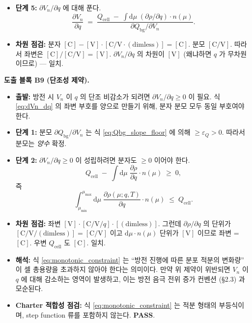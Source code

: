 \documentclass[11pt,a4paper]{article}
\newcommand{\dd}{\mathrm{d}}
\newcommand{\bg}{\mathrm{bg}}
\newcommand{\cell}{\mathrm{cell}}
\newcommand{\Cunit}{\mathrm{C}}
\newcommand{\mucont}{\mu}
\newcommand{\nmu}{n(\mucont)}
\begin{document}
\begin{itemize}
\begin{equation}
      \label{eq:cb_dq_combined}
      \end{equation}
\item \textbf{단계 5:} $\partial V_n/\partial q$ 에 대해 푼다.
      \begin{equation}
      \boxed{
      \frac{\partial V_n}{\partial q}
      \;=\;
      \frac{
      Q_{\cell}
      \;-\;
      \int \dd\mucont\;(\partial \rho/\partial q) \cdot \nmu
      }
      {\partial Q_{\bg}/\partial V_n}.
      }
      \label{eq:dVn_dq}
      \end{equation}
\item \textbf{차원 점검:} 분자 $[\Cunit] - [\mathrm{V}]\cdot[\Cunit/\mathrm{V}\cdot
      \mathrm{(dimless)}] = [\Cunit]$. 분모 $[\Cunit/\mathrm{V}]$. 따라서 좌변은
      $[\Cunit] / [\Cunit/\mathrm{V}] = [\mathrm{V}]$. $\partial V_n/\partial q$
      의 차원이 $[\mathrm{V}]$ (왜냐하면 $q$ 가 무차원이므로) — 일치.
\end{itemize}

\textbf{도출 블록 B9 (단조성 제약).}

\begin{itemize}
\item \textbf{출발:} 방전 시 $V_n$ 이 $q$ 의 단조 비감소가 되려면 $\partial V_n/\partial q \ge 0$ 이 필요. 식 \eqref{eq:dVn_dq} 의 좌변 부호를
      양으로 만들기 위해, 분자 분모 모두 동일 부호여야 한다.
\item \textbf{단계 1:} 분모 $\partial Q_{\bg}/\partial V_n$ 는 식
      \eqref{eq:Qbg_slope_floor} 에 의해 $\ge \varepsilon_Q > 0$. 따라서 분모는
      \emph{양수} 확정.
\item \textbf{단계 2:} $\partial V_n/\partial q \ge 0$ 이 성립하려면 분자도
      $\ge 0$ 이어야 한다.
      \begin{equation}
      Q_{\cell}
      \;-\;
      \int \dd\mucont\;\frac{\partial \rho}{\partial q} \cdot \nmu
      \;\ge\; 0,
      \end{equation}
      즉
      \begin{equation}
      \boxed{
      \int_{\mucont_{\min}}^{\mucont_{\max}} \dd\mucont\;
      \frac{\partial \rho(\mucont; q, T)}{\partial q} \cdot \nmu
      \;\le\;
      Q_{\cell}.
      }
      \label{eq:monotonic_constraint}
      \end{equation}
\item \textbf{차원 점검:} 좌변 $[\mathrm{V}] \cdot [\Cunit/\mathrm{V}/q]
      \cdot [\mathrm{(dimless)}]$. 그런데 $\partial \rho / \partial q$ 의 단위가
      $[\Cunit/\mathrm{V}/(\mathrm{dimless})] = [\Cunit/\mathrm{V}]$ 이고
      $\dd \mucont \cdot \nmu$ 단위가 $[\mathrm{V}]$ 이므로 좌변 = $[\Cunit]$.
      우변 $Q_{\cell}$ 도 $[\Cunit]$. 일치.
\item \textbf{해석:} 식 \eqref{eq:monotonic_constraint} 는 ``방전 진행에 따른
      분포 적분의 변화량'' 이 셀 총용량을 초과하지 않아야 한다는 의미이다. 만약
      위 제약이 위반되면 $V_n$ 이 $q$ 에 대해 감소하는 영역이 발생하고, 이는 방전
      음극 전위 증가 컨벤션 (\S 2.3) 과 모순된다.
\item \textbf{Charter 적합성 점검:} 식 \eqref{eq:monotonic_constraint} 는 적분
      형태의 부등식이며, step function 류를 포함하지 않는다. \textbf{PASS}.
\end{itemize}
\end{document}
